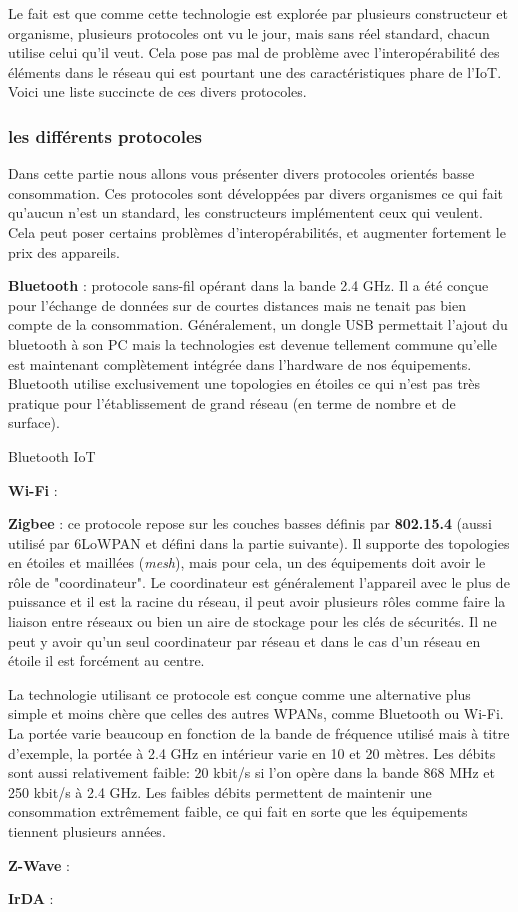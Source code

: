Le fait est que comme cette technologie est explorée par plusieurs constructeur et organisme, plusieurs protocoles ont vu le jour, mais sans réel standard, chacun utilise celui qu'il veut. Cela pose pas mal de problème avec l'interopérabilité des éléments dans le réseau qui est pourtant une des caractéristiques phare de l'IoT. Voici une liste succincte de ces divers protocoles.

\subsubsection{les différents protocoles}

Dans cette partie nous allons vous présenter divers protocoles orientés basse consommation. Ces protocoles sont développées par divers organismes ce qui fait qu'aucun n'est un standard, les constructeurs implémentent ceux qui veulent. Cela peut poser certains problèmes d'interopérabilités, et augmenter fortement le prix des appareils.

\textbf{Bluetooth} : protocole sans-fil opérant dans la bande 2.4 GHz. Il a été conçue pour l'échange de données sur de courtes distances mais ne tenait pas bien compte de la consommation. Généralement, un dongle USB permettait l'ajout du bluetooth à son PC mais la technologies est devenue tellement commune qu'elle est maintenant complètement intégrée dans l'hardware de nos équipements. Bluetooth utilise exclusivement une topologies en étoiles ce qui n'est pas très pratique pour l'établissement de grand réseau (en terme de nombre et de surface).

Bluetooth IoT

\textbf{Wi-Fi} :

\textbf{Zigbee} : ce protocole repose sur les couches basses définis par \textbf{802.15.4} (aussi utilisé par 6LoWPAN et défini dans la partie suivante). Il supporte des topologies en étoiles et maillées (\textit{mesh}), mais pour cela, un des équipements doit avoir le rôle de "coordinateur". Le coordinateur est généralement l'appareil avec le plus de puissance et il est la racine du réseau, il peut avoir plusieurs rôles comme faire la liaison entre réseaux ou bien un aire de stockage pour les clés de sécurités. Il ne peut y avoir qu'un seul coordinateur par réseau et dans le cas d'un réseau en étoile il est forcément au centre.

La technologie utilisant ce protocole est conçue comme une alternative plus simple et moins chère que celles des autres WPANs, comme Bluetooth ou Wi-Fi. La portée varie beaucoup en fonction de la bande de fréquence utilisé mais à titre d'exemple, la portée à 2.4 GHz en intérieur varie en 10 et 20 mètres. Les débits sont aussi relativement faible: 20 kbit/s si l'on opère dans la bande 868 MHz et 250 kbit/s à 2.4 GHz. Les faibles débits permettent de maintenir une consommation extrêmement faible, ce qui fait en sorte que les équipements tiennent plusieurs années.

\textbf{Z-Wave} :

\textbf{IrDA} :